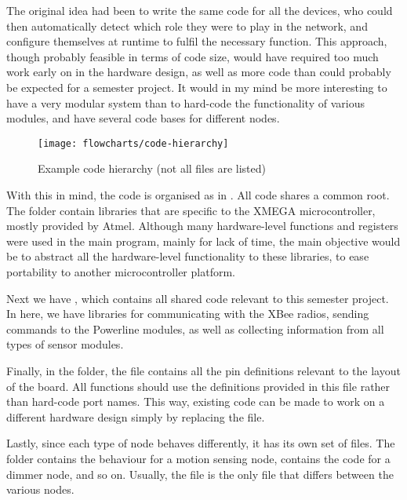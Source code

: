 The original idea had been to write the same code for all the devices, who could
then automatically detect which role they were to play in the network, and
configure themselves at runtime to fulfil the necessary function. This approach,
though probably feasible in terms of code size, would have required too much
work early on in the hardware design, as well as more code than could probably
be expected for a semester project. It would in my mind be more interesting to
have a very modular system than to hard-code the functionality of various
modules, and have several code bases for different nodes.

\begin{figure}[h]
  \begin{center}
    \texttt{[image: flowcharts/code-hierarchy]}
  \end{center}
  \caption{Example code hierarchy (not all files are listed)}
  \label{fig:code-hierarchy}
\end{figure}

With this in mind, the code is organised as in .
All code shares a common root. The folder  contain libraries
that are specific to the XMEGA microcontroller, mostly provided by Atmel.
Although many hardware-level functions and registers were used in the main
program, mainly for lack of time, the main objective would be to abstract all
the hardware-level functionality to these libraries, to ease portability to
another microcontroller platform.

Next we have , which contains all shared code relevant to
this semester project. In here, we have libraries for communicating with the
XBee radios, sending commands to the Powerline modules, as well as collecting
information from all types of sensor modules.

Finally, in the  folder, the  file contains
all the pin definitions relevant to the layout of the board. All functions
should use the definitions provided in this file rather than hard-code port
names. This way, existing code can be made to work on a different hardware
design simply by replacing the  file.

Lastly, since each type of node behaves differently, it has its own set of
files. The  folder contains the behaviour for a motion
sensing node,  contains the code for a dimmer node, and so
on. Usually, the  file is the only file that differs between the
various nodes.

